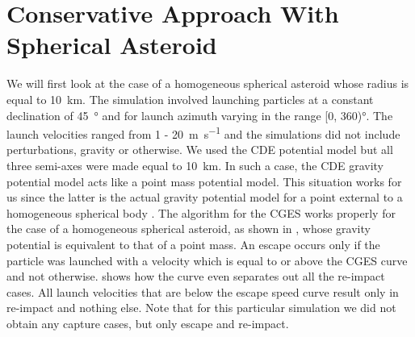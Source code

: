 \section{Conservative Approach With Spherical Asteroid}
\label{sec:conservative_spherical_asteroid_results}
We will first look at the case of a homogeneous spherical asteroid whose radius is equal to \SI{10}{\kilo\metre}. The simulation involved launching particles at a constant declination of \SI{45}{\degree} and for launch azimuth varying in the range [0, 360)\si{\degree}. The launch velocities ranged from 1 - \SI{20}{\metre \per \second} and the simulations did not include perturbations, gravity or otherwise. We used the \gls{CDE} potential model but all three semi-axes were made equal to \SI{10}{\kilo\metre}. In such a case, the \gls{CDE} gravity potential model acts like a point mass potential model. This situation works for us since the latter is the actual gravity potential model for a point external to a homogeneous spherical body \parencite{macmillanPotential}.
%
\newline\newline
%
The algorithm for the \gls{CGES} works properly for the case of a homogeneous spherical asteroid, as shown in , whose gravity potential is equivalent to that of a point mass. An escape occurs only if the particle was launched with a velocity which is equal to or above the \gls{CGES} curve and not otherwise.  shows how the curve even separates out all the re-impact cases. All launch velocities that are below the escape speed curve result only in re-impact and nothing else. Note that for this particular simulation we did not obtain any capture cases, but only escape and re-impact.
